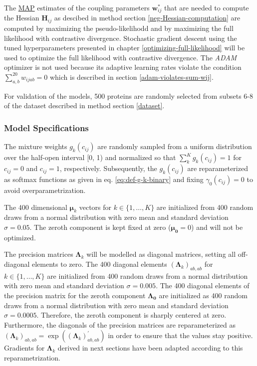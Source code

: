 \documentclass[11pt,a4paper,twoside]{book}
\newcommand{\eq}{\!=\!}
\renewcommand{\H}{\mathbf{H}}
\newcommand{\Hij}{\H_{ij}}
\newcommand{\Lk}{\mathbf{\Lambda}_k}
\newcommand{\muk}{\mathbf{\mu}_k}
\newcommand{\cij}{c_{ij}}
\newcommand{\wij}{\mathbf{w}_{ij}}
\newcommand{\wijab}{w_{ijab}}
\theoremstyle{definition}
\theoremstyle{definition}
\theoremstyle{remark}
\begin{document}
The \protect\hyperlink{abbrev}{MAP} estimates of the coupling parameters
\(\wij^*\) that are needed to compute the Hessian \(\Hij\) as descibed
in method section \ref{neg-Hessian-computation} are computed by
maximizing the pseudo-likelihodd and by maximizing the full likelihood
with contrastive divergence. Stochastic gradient descent using the tuned
hyperparameters presented in chapter \ref{optimizing-full-likelihood}
will be used to optimize the full likelihood with contrastive
divergence. The \emph{ADAM} optimizer is not used because its adaptive
learning rates violate the condition \(\sum_{a,b}^{20} \wijab = 0\)
which is described in section \ref{adam-violates-sum-wij}.

For validation of the models, 500 proteins are randomly selected from
subsets 6-8 of the dataset described in method section \ref{dataset}.

\subsubsection{Model
Specifications}\label{model-specifications-training-bayesian-model}

The mixture weights \(g_k(\cij)\) are randomly sampled from a uniform
distribution over the half-open interval {[}0, 1) and normalized so that
\(\sum_k^K g_k(\cij) = 1\) for \(\cij=0\) and \(\cij=1\), respectively.
Subsequently, the \(g_k(\cij)\) are reparameterized as softmax functions
as given in eq. \eqref{eq:def-g-k-binary} and fixing \(\gamma_0(\cij)=0\)
to avoid overparametrization.

The 400 dimensional \(\muk\) vectors for \(k \in \{1, \ldots, K\}\) are
initialized from 400 random draws from a normal distribution with zero
mean and standard deviation \(\sigma \eq 0.05\). The zeroth component is
kept fixed at zero (\(\mathbf{\mu_0} \eq 0\)) and will not be optimized.

The precision matrices \(\Lk\) will be modelled as diagonal matrices,
setting all off-diagonal elements to zero. The 400 diagonal elements
\((\Lk)_{ab, ab}\) for \(k \in \{1, \ldots, K\}\) are initialized from
400 random draws from a normal distribution with zero mean and standard
deviation \(\sigma \eq 0.005\). The 400 diagonal elements of the
precision matrix for the zeroth component \(\mathbf{\Lambda_0}\) are
initialized as 400 random draws from a normal distribution with zero
mean and standard deviation \(\sigma \eq 0.0005\). Therefore, the zeroth
component is sharply centered at zero. Furthermore, the diagonals of the
precision matrices are reparameterized as
\((\Lk)_{ab, ab} = \exp((\Lk)_{ab, ab}^{\prime})\) in order to ensure
that the values stay positive. Gradients for \(\Lk\) derived in next
sections have been adapted according to this reparametrization.
\end{document}

